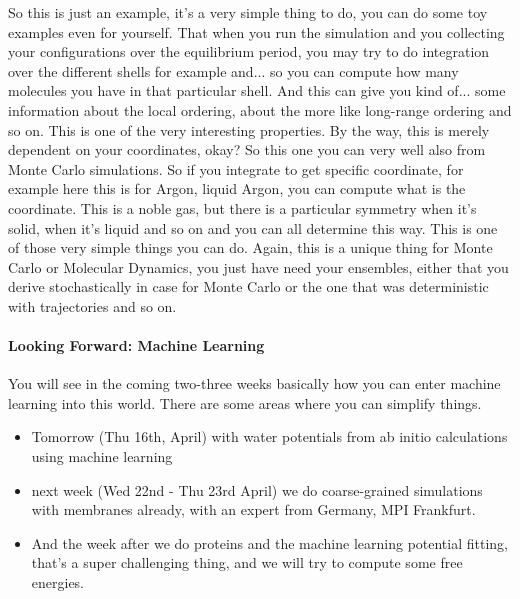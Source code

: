 So this is just an example, it’s a very simple thing to do, you can do some toy examples even for yourself. That when you run the simulation and you collecting your configurations over the equilibrium period, you may try to do integration over the different shells for example and... so you can compute how many molecules you have in that particular shell. And this can give you kind of... some information about the local ordering, about the more like long-range ordering and so on. This is one of the very interesting properties. By the way, this is merely dependent on your coordinates, okay? So this one you can very well also from Monte Carlo simulations. So if you integrate to get specific coordinate, for example here this is for Argon, liquid Argon, you can compute what is the coordinate. This is a noble gas, but there is a particular symmetry when it's solid, when it's liquid and so on and you can all determine this way. This is one of those very simple things you can do. Again, this is a unique thing for Monte Carlo or Molecular Dynamics, you just have need your ensembles, either that you derive stochastically in case for Monte Carlo or the one that was deterministic with trajectories and so on.

\paragraph{Looking Forward: Machine Learning}
You will see in the coming two-three weeks basically how you can enter machine learning into this world. There are some areas where you can simplify things.
\begin{itemize}
\item Tomorrow (Thu 16th, April) with water potentials from ab initio calculations using machine learning
\item  next week (Wed 22nd - Thu 23rd April) we do coarse-grained simulations with membranes already, with an expert from Germany, MPI Frankfurt.
\item  And the week after we do proteins and the machine learning potential fitting, that's a super challenging thing, and we will try to compute some free energies. 
\end{itemize}